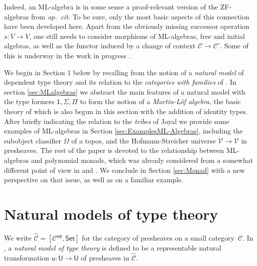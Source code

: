 \documentclass[12pt,reqno]{amsart}
\newcommand{\C}{\ensuremath{\mathbb{C}}}
\newcommand{\CC}{\ensuremath{\mathcal{C}}}
\newcommand{\op}[1]{\ensuremath{{#1}^{\mathsf{op}}}}
\newcommand{\psh}[1]{\ensuremath{[\op{#1},\mathsf{Set}]}}
\newcommand{\Set}{\ensuremath{\mathsf{Set}}}
\renewcommand{\to}{\ensuremath{\rightarrow}}
\renewcommand{\t}{\ensuremath{\mathsf{u}}}
\newcommand{\T}{\ensuremath{\mathsf{U}}}
\newcommand{\TT}{\ensuremath{\dot{\mathsf{U}}}}
\newcommand{\V}{\ensuremath{\mathcal{V}}}
\newcommand{\VV}{\ensuremath{\dot{\mathcal{V}}}}
\theoremstyle{remark}
\theoremstyle{definition}
\begin{document}
Indeed, an ML-algebra is in some sense a proof-relevant version of the ZF-algebras from \emph{op.\ cit.}  To be sure, only the most basic aspects of this connection have been developed here.   Apart from the obviously missing successor operation $s : V\to V$, one still needs to consider morphisms of ML-algebras, free and initial algebras, as well as the functor induced by a change of context $\CC \to \CC'$. Some of this is underway in the work in progress \cite{Fernando}.
\medskip

We begin in Section 1 below by recalling from \cite{awodey:NM} the notion of a \emph{natural model} of dependent type theory and its relation to the \emph{categories with families} of \cite{Dybjer:CWF}.  In section \ref{sec:MLalgebras} we abstract the main features of a natural model with the type formers $\mathsf{1}, \Sigma, \Pi$ to form the notion of a \emph{Martin-L\"of algebra}, the basic theory of which is also begun in this section with the addition of identity types.   After briefly indicating the relation to the \emph{tribes} of Joyal \cite{Joyal:CandT} we provide some examples of ML-algebras in Section \ref{sec:ExamplesML-Algebras}, including the subobject classifier $\Omega$ of a topos, and the Hofmann-Streicher universe $\VV\to\V$ in presheaves.  The rest of the paper is devoted to the relationship between ML-algebras and polynomial monads, which was already considered from a somewhat different point of view in \cite{ Newstead:thesis} and \cite{NA:2018}.  We conclude in Section \ref{sec:Monad} with a new perspective on that issue, as well as on a familiar example. 

\section{Natural models of type theory}\label{sec:NaturalModels}

\noindent We write $\widehat{\CC} = \psh{\CC}$ for the category of presheaves on a small category~$\CC$. 
In \cite{awodey:NM}, a \emph{natural model of type theory} is defined to be a representable natural transformation $\t: \TT\to \T$ of presheaves in $\widehat{\CC}$.  
\end{document}
